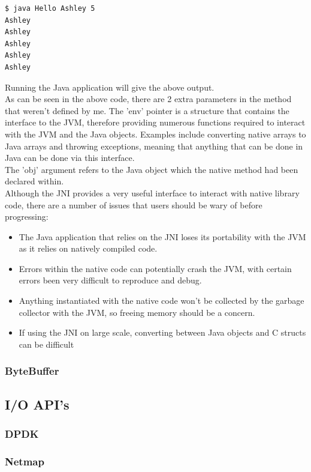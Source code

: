 \documentclass[a4paper, titlepage]{article}
\begin{document}
\begin{lstlisting}[language=sh]
$ java Hello Ashley 5
Ashley
Ashley
Ashley
Ashley
Ashley
\end{lstlisting}
Running the Java application will give the above output. \\
\newline
As can be seen in the above code, there are 2 extra parameters in the method that weren't defined by me. The 'env' pointer is a structure that contains the interface to the JVM, therefore providing numerous functions required to interact with the JVM and the Java objects. Examples include converting native arrays to Java arrays and throwing exceptions, meaning that anything that can be done in Java can be done via this interface. \\
\newline
The 'obj' argument refers to the Java object which the native method had been declared within. \\
\newline
Although the JNI provides a very useful interface to interact with native library code, there are a number of issues that users should be wary of before progressing:
\begin{itemize}
	\item The Java application that relies on the JNI loses its portability with the JVM as it relies on natively compiled code.
	\item Errors within the native code can potentially crash the JVM, with certain errors been very difficult to reproduce and debug.
	\item Anything instantiated with the native code won't be collected by the garbage collector with the JVM, so freeing memory should be a concern.
	\item If using the JNI on large scale, converting between Java objects and C structs can be difficult
\end{itemize}

\subsubsection{ByteBuffer}
\subsection{I/O API's}
\subsubsection{DPDK}
\subsubsection{Netmap}
\end{document}
